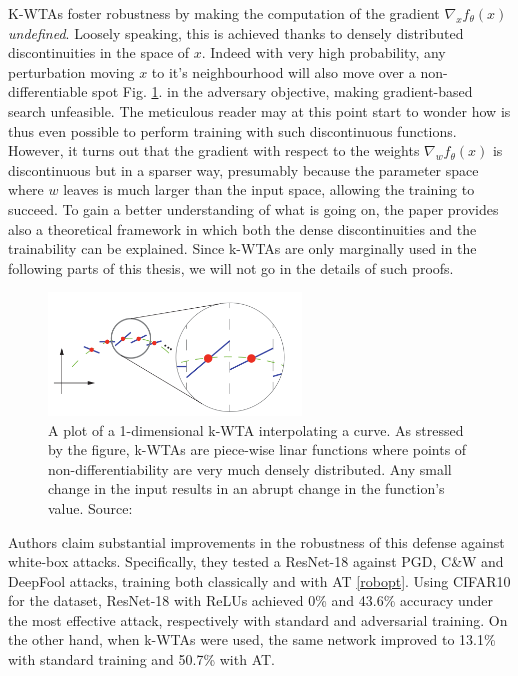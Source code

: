 \documentclass[LaM,binding=0.6cm]{./packages/sapthesis/sapthesis}
\begin{document}
    K-WTAs foster robustness by making the computation of the gradient $\nabla_x f_{\theta}(x)$ \textit{undefined}.
    Loosely speaking, this is achieved thanks to densely distributed discontinuities in the space of $x$. Indeed
    with very high probability, any perturbation moving $x$ to it's neighbourhood will also move over a non-differentiable spot Fig. \ref{fig:kwta}.
    in the adversary objective, making gradient-based search unfeasible. The meticulous reader may at this point start to wonder
    how is thus even possible to perform training with such discontinuous functions. However, it turns out that the gradient 
    with respect to the weights $\nabla_w f_{\theta}(x)$ is discontinuous but in a sparser way, presumably because the parameter 
    space where $w$ leaves is much larger than the input space, allowing the training to succeed. To gain a better understanding
    of what is going on, the paper provides also a theoretical framework in which both the dense discontinuities and the trainability 
    can be explained. Since k-WTAs are only marginally used in the following parts of this thesis, we will not go in the details
    of such proofs.

    \begin{figure}[h]
        \centering
        \includegraphics[width=0.6\textwidth]{kwta}
        \caption{A plot of a 1-dimensional k-WTA interpolating a curve. As stressed by the figure, k-WTAs are piece-wise linar functions where points of non-differentiability are 
        very much densely distributed. Any small change in the input results in an abrupt change in the function's value. Source: \cite{kwta}}
        \label{fig:kwta}
    \end{figure}
    
    Authors claim substantial improvements in the robustness of this defense against white-box attacks. Specifically, they tested a ResNet-18 against PGD, C\&W and DeepFool \cite{deepfool} attacks, training both classically and with AT \ref{robopt}.
    Using CIFAR10 for the dataset, ResNet-18 with ReLUs achieved 0\% and 43.6\% accuracy under the most effective attack,
    respectively with standard and adversarial training. On the other hand, when k-WTAs were used, the same network improved to
    13.1\% with standard training and 50.7\% with AT.
\end{document}
